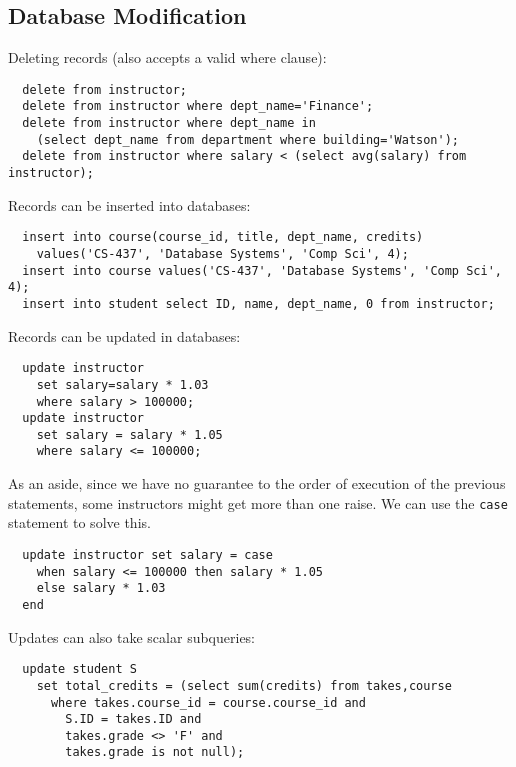 \documentclass{math}
\begin{document}
\subsection*{Database Modification}
Deleting records (also accepts a valid where clause):
\begin{lstlisting}
  delete from instructor;
  delete from instructor where dept_name='Finance';
  delete from instructor where dept_name in
    (select dept_name from department where building='Watson');
  delete from instructor where salary < (select avg(salary) from instructor);
\end{lstlisting}
Records can be inserted into databases:
\begin{lstlisting}
  insert into course(course_id, title, dept_name, credits)
    values('CS-437', 'Database Systems', 'Comp Sci', 4);
  insert into course values('CS-437', 'Database Systems', 'Comp Sci', 4);
  insert into student select ID, name, dept_name, 0 from instructor;
\end{lstlisting}
Records can be updated in databases:
\begin{lstlisting}
  update instructor
    set salary=salary * 1.03
    where salary > 100000;
  update instructor
    set salary = salary * 1.05
    where salary <= 100000;
\end{lstlisting}
As an aside, since we have no guarantee to the order of execution of the
previous statements, some instructors might get more than one raise. We can
use the \texttt{case} statement to solve this.
\begin{lstlisting}
  update instructor set salary = case
    when salary <= 100000 then salary * 1.05
    else salary * 1.03
  end
\end{lstlisting}
Updates can also take scalar subqueries:
\begin{lstlisting}
  update student S
    set total_credits = (select sum(credits) from takes,course
      where takes.course_id = course.course_id and
        S.ID = takes.ID and
        takes.grade <> 'F' and
        takes.grade is not null);
\end{lstlisting}
\end{document}
